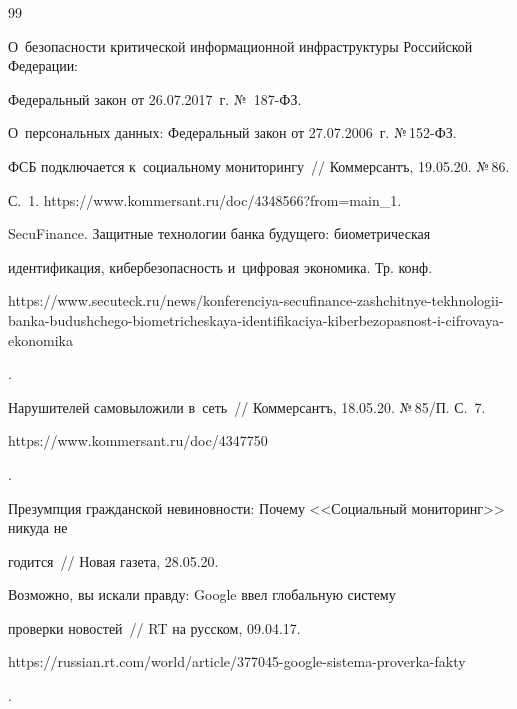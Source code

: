 {\small\frenchspacing


{%




\begin{thebibliography}{99}




О~безопасности критической информационной инфраструктуры Российской Федерации: 


Федеральный закон от 26.07.2017~г. № \,187-ФЗ.




О~персональных данных: Федеральный закон от 27.07.2006~г. №\,152-ФЗ.




ФСБ подключается к~социальному мониторингу~/\!\!/ Коммерсантъ,  19.05.20.  №\,86.


С.~1. {\sf https://www.kommersant.ru/doc/4348566?from=main\_1}. 




SecuFinance. Защитные технологии банка будущего: биометрическая 


идентификация, кибербезопасность и~цифровая экономика. Тр. конф. {\sf 


 https://www.\linebreak secuteck.ru/news/konferenciya-secufinance-zashchitnye-tekhnologii-banka-budushchego-biometricheskaya-identifikaciya-kiberbezopasnost-i-cifrovaya-ekonomika}.




Нарушителей самовыложили в~сеть~/\!\!/ Коммерсантъ, 18.05.20.  №\,85/П. С.~7. {\sf 


https://www.kommersant.ru/doc/4347750}.







 Презумпция гражданской невиновности: Почему <<Социальный мониторинг>> никуда не 


годится~/\!\!/ Новая газета, 28.05.20. 




 Возможно, вы искали правду: Google ввел глобальную систему 


проверки новостей~/\!\!/ RT на русском, 09.04.17. {\sf  


https://russian.rt.com/\linebreak world/article/377045-google-sistema-proverka-fakty}. 






\end{thebibliography}}}
